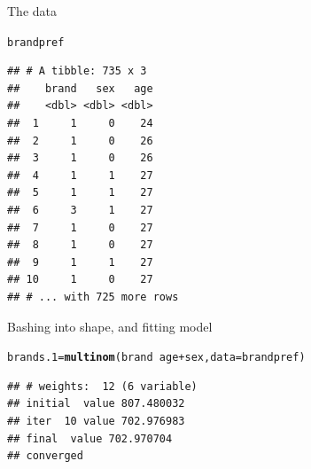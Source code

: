 \documentclass[unknownkeysallowed]{beamer}\usepackage[]{graphicx}\usepackage[]{color}
\makeatletter
\newcommand{\hlopt}[1]{\textcolor[rgb]{0,0,0}{#1}}%
\newcommand{\hlstd}[1]{\textcolor[rgb]{0.345,0.345,0.345}{#1}}%
\newcommand{\hlkwb}[1]{\textcolor[rgb]{0.69,0.353,0.396}{#1}}%
\newcommand{\hlkwc}[1]{\textcolor[rgb]{0.333,0.667,0.333}{#1}}%
\newcommand{\hlkwd}[1]{\textcolor[rgb]{0.737,0.353,0.396}{\textbf{#1}}}%
\newenvironment{kframe}{%
 \def\at@end@of@kframe{}%
 \ifinner\ifhmode%
  \def\at@end@of@kframe{\end{minipage}}%
  \begin{minipage}{\columnwidth}%
 \fi\fi%
 \def\FrameCommand##1{\hskip\@totalleftmargin \hskip-\fboxsep
 \colorbox{shadecolor}{##1}\hskip-\fboxsep
     \hskip-\linewidth \hskip-\@totalleftmargin \hskip\columnwidth}%
 \MakeFramed {\advance\hsize-\width
   \@totalleftmargin\z@ \linewidth\hsize
   \@setminipage}}%
 {\par\unskip\endMakeFramed%
 \at@end@of@kframe}
\newenvironment{knitrout}{}{} %
\makeatother
\begin{document}
\begin{frame}[fragile]{The data}
  
\begin{knitrout}
\color{fgcolor}\begin{kframe}
\begin{alltt}
\hlstd{brandpref}
\end{alltt}
\begin{verbatim}
## # A tibble: 735 x 3
##    brand   sex   age
##    <dbl> <dbl> <dbl>
##  1     1     0    24
##  2     1     0    26
##  3     1     0    26
##  4     1     1    27
##  5     1     1    27
##  6     3     1    27
##  7     1     0    27
##  8     1     0    27
##  9     1     1    27
## 10     1     0    27
## # ... with 725 more rows
\end{verbatim}
\end{kframe}
\end{knitrout}
  
\end{frame}

\begin{frame}[fragile]{Bashing into shape, and fitting model}


 
\begin{knitrout}
\color{fgcolor}\begin{kframe}
\begin{alltt}
\hlstd{brands.1}\hlkwb{=}\hlkwd{multinom}\hlstd{(brand}\hlopt{~}\hlstd{age}\hlopt{+}\hlstd{sex,}\hlkwc{data}\hlstd{=brandpref)}
\end{alltt}
\begin{verbatim}
## # weights:  12 (6 variable)
## initial  value 807.480032 
## iter  10 value 702.976983
## final  value 702.970704 
## converged
\end{verbatim}
\end{kframe}
\end{knitrout}
  
\end{frame}
\end{document}
